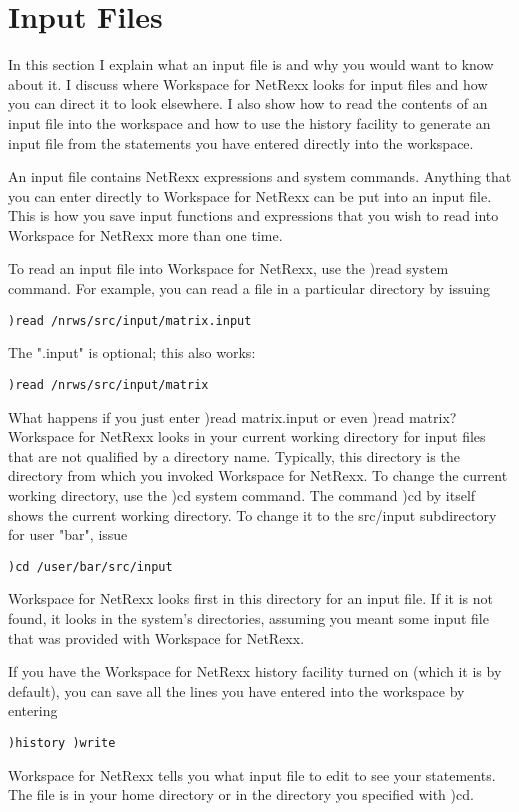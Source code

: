 \section{Input Files}

In this section I explain what an input file is and why you would want to know about it. I discuss where Workspace for NetRexx looks for input files and how you can direct it to look elsewhere. I also show how to read the contents of an input file into the workspace and how to use the history facility to generate an input file from the statements you have entered directly into the workspace.

An input file contains NetRexx expressions and system commands. Anything that you can enter directly to Workspace for NetRexx can be put into an input file. This is how you save input functions and expressions that you wish to read into Workspace for NetRexx more than one time.

To read an input file into Workspace for NetRexx, use the )read system command. For example, you can read a file in a particular directory by issuing
\begin{verbatim}
)read /nrws/src/input/matrix.input
\end{verbatim}

The ".input" is optional; this also works:
\begin{verbatim}
)read /nrws/src/input/matrix
\end{verbatim}
What happens if you just enter )read matrix.input or even )read matrix? Workspace for NetRexx looks in your current working directory for input files that are not qualified by a directory name. Typically, this directory is the directory from which you invoked Workspace for NetRexx. To change the current working directory, use the )cd system command. The command )cd by itself shows the current working directory. To change it to the src/input subdirectory for user "bar", issue

\begin{verbatim}
)cd /user/bar/src/input
\end{verbatim}
Workspace for NetRexx looks first in this directory for an input file. If it is not found, it looks in the system's directories, assuming you meant some input file that was provided with Workspace for NetRexx.

If you have the Workspace for NetRexx history facility turned on (which it is by default), you can save all the lines you have entered into the workspace by entering
\begin{verbatim}
)history )write
\end{verbatim}
Workspace for NetRexx tells you what input file to edit to see your statements. The file is in your home directory or in the directory you specified with )cd.

